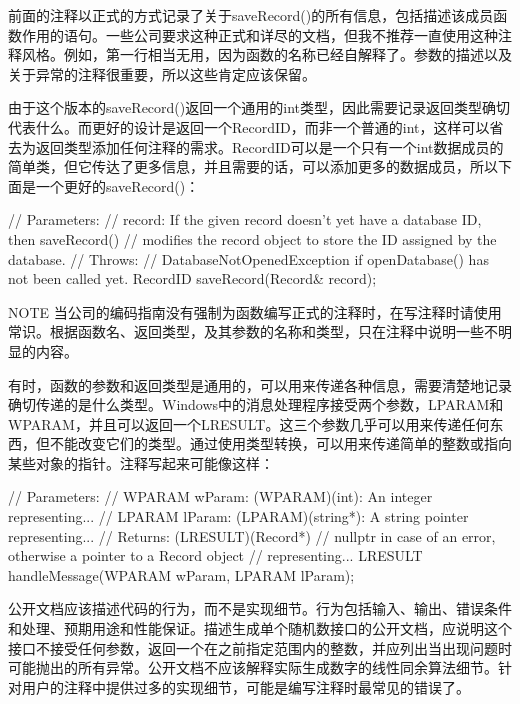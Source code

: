 前面的注释以正式的方式记录了关于saveRecord()的所有信息，包括描述该成员函数作用的语句。一些公司要求这种正式和详尽的文档，但我不推荐一直使用这种注释风格。例如，第一行相当无用，因为函数的名称已经自解释了。参数的描述以及关于异常的注释很重要，所以这些肯定应该保留。

由于这个版本的saveRecord()返回一个通用的int类型，因此需要记录返回类型确切代表什么。而更好的设计是返回一个RecordID，而非一个普通的int，这样可以省去为返回类型添加任何注释的需求。RecordID可以是一个只有一个int数据成员的简单类，但它传达了更多信息，并且需要的话，可以添加更多的数据成员，所以下面是一个更好的saveRecord()：

\begin{cpp}
// Parameters:
//    record: If the given record doesn't yet have a database ID, then saveRecord()
//    modifies the record object to store the ID assigned by the database.
// Throws:
//    DatabaseNotOpenedException if openDatabase() has not been called yet.
RecordID saveRecord(Record& record);
\end{cpp}

\begin{myNotic}{NOTE}
当公司的编码指南没有强制为函数编写正式的注释时，在写注释时请使用常识。根据函数名、返回类型，及其参数的名称和类型，只在注释中说明一些不明显的内容。
\end{myNotic}

有时，函数的参数和返回类型是通用的，可以用来传递各种信息，需要清楚地记录确切传递的是什么类型。Windows中的消息处理程序接受两个参数，LPARAM和WPARAM，并且可以返回一个LRESULT。这三个参数几乎可以用来传递任何东西，但不能改变它们的类型。通过使用类型转换，可以用来传递简单的整数或指向某些对象的指针。注释写起来可能像这样：

\begin{cpp}
// Parameters:
//    WPARAM wParam: (WPARAM)(int): An integer representing...
//    LPARAM lParam: (LPARAM)(string*): A string pointer representing...
// Returns: (LRESULT)(Record*)
//    nullptr in case of an error, otherwise a pointer to a Record object
//    representing...
LRESULT handleMessage(WPARAM wParam, LPARAM lParam);
\end{cpp}

公开文档应该描述代码的行为，而不是实现细节。行为包括输入、输出、错误条件和处理、预期用途和性能保证。描述生成单个随机数接口的公开文档，应说明这个接口不接受任何参数，返回一个在之前指定范围内的整数，并应列出当出现问题时可能抛出的所有异常。公开文档不应该解释实际生成数字的线性同余算法细节。针对用户的注释中提供过多的实现细节，可能是编写注释时最常见的错误了。

